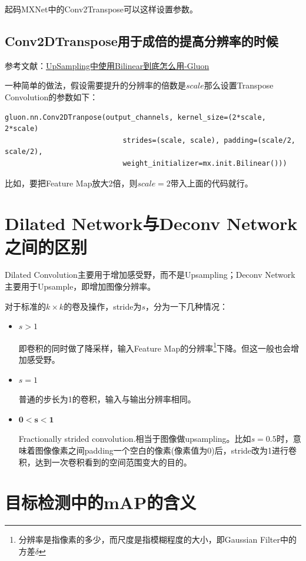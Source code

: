 起码MXNet中的Conv2Transpose可以这样设置参数。

\subsection{Conv2DTranspose用于成倍的提高分辨率的时候}

参考文献：\href{https://discuss.gluon.ai/t/topic/2823/4}{UpSampling中使用Bilinear到底怎么用-Gluon}

一种简单的做法，假设需要提升的分辨率的倍数是$scale$那么设置Transpose Convolution的参数如下：
\begin{verbatim}
gluon.nn.Conv2DTranpose(output_channels, kernel_size=(2*scale, 2*scale) 
							strides=(scale, scale), padding=(scale/2, scale/2), 
							weight_initializer=mx.init.Bilinear()))
\end{verbatim}

比如，要把Feature Map放大2倍，则$scale=2$带入上面的代码就行。


\section{Dilated Network与Deconv Network之间的区别}
Dilated Convolution主要用于增加感受野，而不是Upsampling；Deconv Network主要用于Upsample，即增加图像分辨率。

对于标准的$k \times k$的卷及操作，stride为$s$，分为一下几种情况：
\begin{itemize}
\item $s > 1$

即卷积的同时做了降采样，输入Feature Map的分辨率\footnote{分辨率是指像素的多少，而尺度是指模糊程度的大小，即Gaussian Filter中的方差$\delta$}下降。但这一般也会增加感受野。

\item $s = 1$

普通的步长为1的卷积，输入与输出分辨率相同。

\item $\mathbf{0 < s < 1}$

Fractionally strided convolution.相当于图像做upsampling。比如$s=0.5$时，意味着图像像素之间padding一个空白的像素(像素值为0)后，stride改为1进行卷积，达到一次卷积看到的空间范围变大的目的。

\end{itemize}

\section{目标检测中的mAP的含义}

